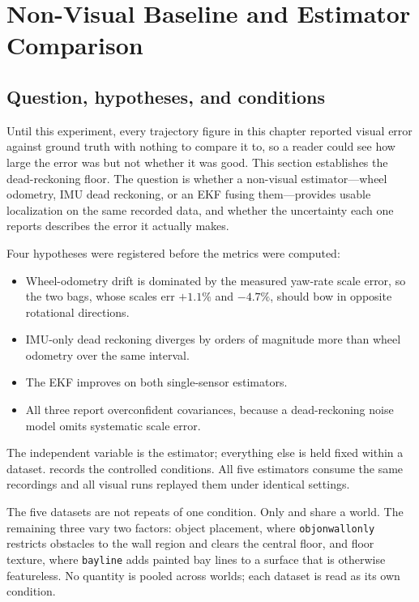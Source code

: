 \section{Non-Visual Baseline and Estimator Comparison}
\label{sec:results-proprio}

\subsection{Question, hypotheses, and conditions}

Until this experiment, every trajectory figure in this chapter reported visual
error against ground truth with nothing to compare it to, so a reader could see
how large the error was but not whether it was good. This section establishes the
dead-reckoning floor. The question is whether a non-visual estimator---wheel
odometry, IMU dead reckoning, or an EKF fusing them---provides usable
localization on the same recorded data, and whether the uncertainty each one
reports describes the error it actually makes.

Four hypotheses were registered before the metrics were computed:
\begin{itemize}
  \item[H1] Wheel-odometry drift is dominated by the measured yaw-rate scale
    error, so the two bags, whose scales err $+1.1\%$ and $-4.7\%$, should bow in
    opposite rotational directions.
  \item[H2] IMU-only dead reckoning diverges by orders of magnitude more than
    wheel odometry over the same interval.
  \item[H3] The EKF improves on both single-sensor estimators.
  \item[H4] All three report overconfident covariances, because a dead-reckoning
    noise model omits systematic scale error.
\end{itemize}

The independent variable is the estimator; everything else is held fixed within a
dataset.  records the controlled conditions. All five
estimators consume the same recordings and all visual runs replayed them under
identical settings.

The five datasets are not repeats of one condition. Only  and
 share a world. The remaining three vary two factors: object
placement, where \texttt{objonwallonly} restricts obstacles to the wall region and
clears the central floor, and floor texture, where \texttt{bayline} adds painted
bay lines to a surface that is otherwise featureless. No quantity is pooled across
worlds; each dataset is read as its own condition.

